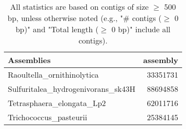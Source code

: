 \documentclass[12pt,a4paper]{article}
\begin{document}
\begin{table}[ht]
\begin{center}
\caption{All statistics are based on contigs of size $\geq$ 500 bp, unless otherwise noted (e.g., "\# contigs ($\geq$ 0 bp)" and "Total length ($\geq$ 0 bp)" include all contigs).}
\begin{tabular}{|l*{1}{|r}|}
\hline
Assemblies & assembly \\ \hline
Raoultella\_ornithinolytica & 33351731 \\ \hline
Sulfuritalea\_hydrogenivorans\_sk43H & 88694858 \\ \hline
Tetrasphaera\_elongata\_Lp2 & 62011716 \\ \hline
Trichococcus\_pasteurii & 25384145 \\ \hline
\end{tabular}
\end{center}
\end{table}
\end{document}
